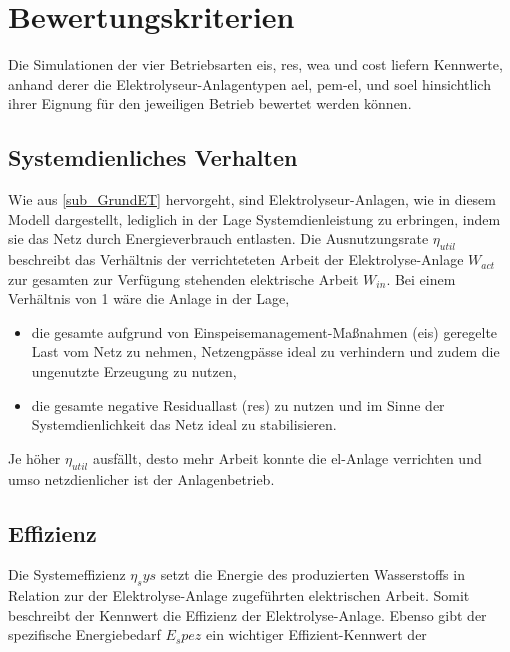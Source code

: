 \documentclass[onecolumn,10pt,titlepage]{article}
\begin{document}
\section{Bewertungskriterien}
\label{Bewertungs-Krit}

Die Simulationen der vier Betriebsarten \gls{eis}, \gls{res}, \gls{wea} und \gls{cost}  liefern Kennwerte, anhand derer die Elektrolyseur-Anlagentypen \gls{ael}, \gls{pem}-\gls{el}, und \gls{soel}
hinsichtlich ihrer Eignung für den jeweiligen Betrieb bewertet werden können.

\subsection{ Systemdienliches Verhalten}%

Wie aus \ref{sub_GrundET} hervorgeht, sind Elektrolyseur-Anlagen, wie in diesem Modell dargestellt, lediglich in der Lage  Systemdienleistung zu erbringen, indem sie das Netz durch Energieverbrauch entlasten. Die  Ausnutzungsrate $\eta_{util}$ beschreibt das Verhältnis der verrichteteten Arbeit der Elektrolyse-Anlage $W_{act}$ zur gesamten zur Verfügung stehenden elektrische Arbeit $W_{in}$.
Bei einem Verhältnis von 1 wäre die Anlage in der Lage,
\begin{itemize}
\item die gesamte aufgrund von Einspeisemanagement-Maßnahmen (\gls{eis}) geregelte Last vom Netz zu nehmen, Netzengpässe ideal zu verhindern und zudem die ungenutzte Erzeugung zu nutzen,
\item die gesamte negative Residuallast (\gls{res}) zu nutzen und im Sinne der Systemdienlichkeit das Netz ideal zu stabilisieren.
\end{itemize}
Je höher $\eta_{util}$ ausfällt, desto mehr Arbeit konnte die \gls{el}-Anlage verrichten und umso netzdienlicher ist der Anlagenbetrieb.

\subsection{Effizienz}
Die Systemeffizienz $\eta_sys$ setzt die Energie des produzierten Wasserstoffs in Relation zur der Elektrolyse-Anlage zugeführten elektrischen Arbeit. Somit beschreibt der Kennwert die Effizienz der Elektrolyse-Anlage. %
Ebenso gibt der spezifische Energiebedarf $E_spez$ ein wichtiger Effizient-Kennwert der

%
%
\end{document}
